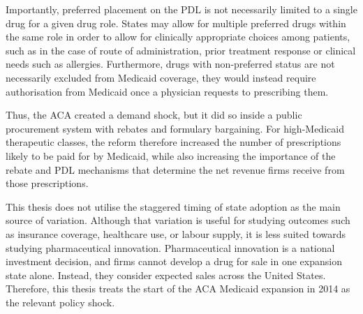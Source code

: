 \documentclass[12pt]{article}
\begin{document}
Importantly, preferred placement on the PDL is not necessarily limited to a single drug for a given drug role. States may allow for multiple preferred drugs within the same role in order to allow for clinically appropriate choices among patients, such as in the case of route of administration, prior treatment response or clinical needs such as allergies. Furthermore, drugs with non-preferred status are not necessarily excluded from Medicaid coverage, they would instead require authorisation from Medicaid once a physician requests to prescribing them.

Thus, the ACA created a demand shock, but it did so inside a public procurement system with rebates and formulary bargaining. For high-Medicaid therapeutic classes, the reform therefore increased the number of prescriptions likely to be paid for by Medicaid, while also increasing the importance of the rebate and PDL mechanisms that determine the net revenue firms receive from those prescriptions.

This thesis does not utilise the staggered timing of state adoption as the main source of variation. Although that variation is useful for studying outcomes such as insurance coverage, healthcare use, or labour supply, it is less suited towards studying pharmaceutical innovation. Pharmaceutical innovation is a national investment decision, and firms cannot develop a drug for sale in one expansion state alone. Instead, they consider expected sales across the United States. Therefore, this thesis treats the start of the ACA Medicaid expansion in 2014 as the relevant policy shock.

\newpage


\end{document}
